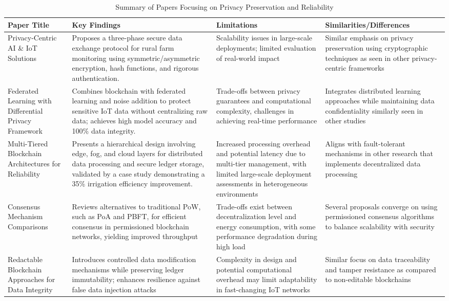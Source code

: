 \documentclass[12pt,onecolumn]{IEEEtran} %
\begin{document}
\begin{table}[htbp]
\centering
\caption{Summary of Papers Focusing on Privacy Preservation and Reliability}
\label{tab:privacy}
\begin{tabularx}{\textwidth}{>{\raggedright\arraybackslash}X>{\raggedright\arraybackslash}X>{\raggedright\arraybackslash}X>{\raggedright\arraybackslash}X}
\toprule
\textbf{Paper Title} & \textbf{Key Findings} & \textbf{Limitations} & \textbf{Similarities/Differences} \\
\midrule
Privacy-Centric AI \& IoT Solutions \cite{rahaman2024privacycentricaiand} & Proposes a three-phase secure data exchange protocol for rural farm monitoring using symmetric/asymmetric encryption, hash functions, and rigorous authentication. & Scalability issues in large-scale deployments; limited evaluation of real-world impact & Similar emphasis on privacy preservation using cryptographic techniques as seen in other privacy-centric frameworks \\
\midrule
Federated Learning with Differential Privacy Framework \cite{daund2025designofan} & Combines blockchain with federated learning and noise addition to protect sensitive IoT data without centralizing raw data; achieves high model accuracy and 100\% data integrity. & Trade-offs between privacy guarantees and computational complexity, challenges in achieving real-time performance & Integrates distributed learning approaches while maintaining data confidentiality similarly seen in other studies \\
\midrule
Multi-Tiered Blockchain Architectures for Reliability \cite{thiruvenkatasamy2025anonlinetool} & Presents a hierarchical design involving edge, fog, and cloud layers for distributed data processing and secure ledger storage, validated by a case study demonstrating a 35\% irrigation efficiency improvement. & Increased processing overhead and potential latency due to multi-tier management, with limited large-scale deployment assessments in heterogeneous environments & Aligns with fault-tolerant mechanisms in other research that implements decentralized data processing \\
\midrule
Consensus Mechanism Comparisons \cite{soy2025blockchainintegrationin} & Reviews alternatives to traditional PoW, such as PoA and PBFT, for efficient consensus in permissioned blockchain networks, yielding improved throughput & Trade-offs exist between decentralization level and energy consumption, with some performance degradation during high load & Several proposals converge on using permissioned consensus algorithms to balance scalability with security \\
\midrule
Redactable Blockchain Approaches for Data Integrity \cite{mishra2023redactableblockchainassistedsecure} & Introduces controlled data modification mechanisms while preserving ledger immutability; enhances resilience against false data injection attacks & Complexity in design and potential computational overhead may limit adaptability in fast-changing IoT networks & Similar focus on data traceability and tamper resistance as compared to non-editable blockchains \\
\bottomrule
\end{tabularx}
\end{table}
\end{document}

